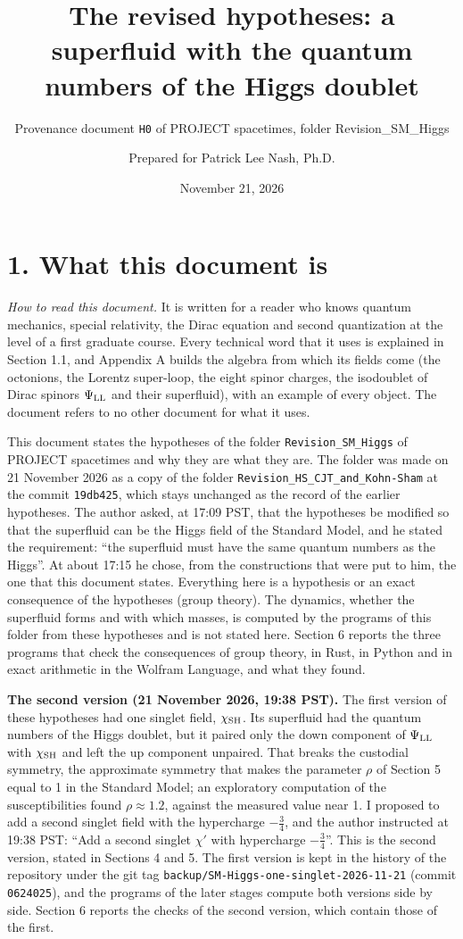 \documentclass[
  10pt,
]{article}
\title{The revised hypotheses: a superfluid with the quantum numbers of
the Higgs doublet}
\subtitle{Provenance document \texttt{H0} of PROJECT spacetimes, folder
Revision\_SM\_Higgs}
\author{Prepared for Patrick Lee Nash, Ph.D.}
\date{November 21, 2026}
\begin{document}
\maketitle

\hypertarget{what-this-document-is}{%
\section{1. What this document is}\label{what-this-document-is}}

\emph{How to read this document.} It is written for a reader who knows
quantum mechanics, special relativity, the Dirac equation and second
quantization at the level of a first graduate course. Every technical
word that it uses is explained in Section 1.1, and Appendix A builds the
algebra from which its fields come (the octonions, the Lorentz
super-loop, the eight spinor charges, the isodoublet of Dirac spinors
\(\Psi_{\rm LL}\) and their superfluid), with an example of every
object. The document refers to no other document for what it uses.

This document states the hypotheses of the folder
\texttt{Revision\_SM\_Higgs} of PROJECT spacetimes and why they are what
they are. The folder was made on 21 November 2026 as a copy of the
folder \texttt{Revision\_HS\_CJT\_and\_Kohn-Sham} at the commit
\texttt{19db425}, which stays unchanged as the record of the earlier
hypotheses. The author asked, at 17:09 PST, that the hypotheses be
modified so that the superfluid can be the Higgs field of the Standard
Model, and he stated the requirement: ``the superfluid must have the
same quantum numbers as the Higgs''. At about 17:15 he chose, from the
constructions that were put to him, the one that this document states.
Everything here is a hypothesis or an exact consequence of the
hypotheses (group theory). The dynamics, whether the superfluid forms
and with which masses, is computed by the programs of this folder from
these hypotheses and is not stated here. Section 6 reports the three
programs that check the consequences of group theory, in Rust, in Python
and in exact arithmetic in the Wolfram Language, and what they found.

\textbf{The second version (21 November 2026, 19:38 PST).} The first
version of these hypotheses had one singlet field, \(\chi_{\rm SH}\).
Its superfluid had the quantum numbers of the Higgs doublet, but it
paired only the down component of \(\Psi_{\rm LL}\) with
\(\chi_{\rm SH}\) and left the up component unpaired. That breaks the
custodial symmetry, the approximate symmetry that makes the parameter
\(\rho\) of Section 5 equal to 1 in the Standard Model; an exploratory
computation of the susceptibilities found \(\rho\approx1.2\), against
the measured value near 1. I proposed to add a second singlet field with
the hypercharge \(-\tfrac34\), and the author instructed at 19:38 PST:
``Add a second singlet \(\chi'\) with hypercharge \(-\tfrac34\)''. This
is the second version, stated in Sections 4 and 5. The first version is
kept in the history of the repository under the git tag
\texttt{backup/SM-Higgs-one-singlet-2026-11-21} (commit
\texttt{0624025}), and the programs of the later stages compute both
versions side by side. Section 6 reports the checks of the second
version, which contain those of the first.
\end{document}
